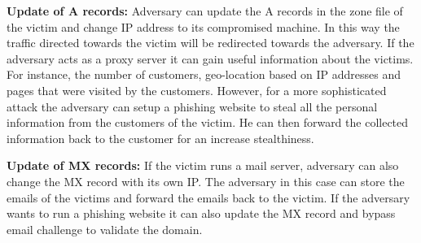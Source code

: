 \textbf{Update of A records:}
Adversary can update the A records in the zone file of the victim and change IP address to its compromised machine. In this way the traffic directed towards the victim will be redirected towards the adversary. If the adversary acts as a proxy server it can gain useful information about the victims. For instance, the number of customers, geo-location based on IP addresses and pages that were visited by the customers. However, for a more sophisticated attack the adversary can setup a phishing website to steal all the personal information from the customers of the victim. He can then forward the collected information back to the customer for an increase stealthiness. 

\textbf{Update of MX records:} 
If the victim runs a mail server, adversary can also change the MX record with its own IP. The adversary in this case can store the emails of the victims and forward the emails back to the victim. If the adversary wants to run a phishing website it can also update the MX record and bypass email challenge to validate the domain. 







